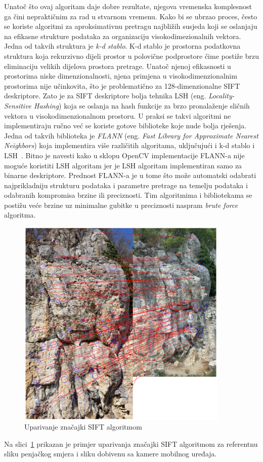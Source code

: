 Unatoč što ovaj algoritam daje dobre rezultate, njegova vremenska komplesnost ga čini nepraktičnim za rad u stvarnom vremenu. Kako bi se ubrzao proces, često se koriste algoritmi za aproksimativnu pretragu najbližih susjeda koji se oslanjaju na efikasne strukture podataka za organizaciju visokodimezionalnih vektora. 
Jedna od takvih struktura je \textit{k-d stablo}. K-d stablo je prostorna podatkovna struktura koja rekurzivno dijeli prostor u polovične podprostore čime postiže brzu eliminaciju velikih dijelova prostora pretrage. Unatoč njenoj efikasnosti u prostorima niske dimenzionalnosti, njena primjena u visokodimenzionalnim prostorima nije učinkovita, što je problematično za 128-dimenzionalne SIFT deskriptore. 
Zato je za SIFT deskriptore bolja tehnika LSH (eng. \textit{Locality-Sensitive Hashing}) koja se oslanja na hash funkcije za brzo pronalaženje sličnih vektora u visokodimenzionalnom prostoru.
U praksi se takvi algoritmi ne implementiraju ručno već se koriste gotove biblioteke koje nude bolja rješenja. Jedna od takvih biblioteka je \textit{FLANN} (eng. \textit{Fast Library for Approximate Nearest Neighbors}) koja implementira više različitih algoritama, uključujući i k-d stablo i LSH~\cite{flannmatcher}. Bitno je navesti kako u sklopu OpenCV implementacije FLANN-a nije moguće koristiti LSH algoritam jer je LSH algoritam implementiran samo za binarne deskriptore.
Prednost FLANN-a je u tome što može automatski odabrati najprikladniju strukturu podataka i parametre pretrage na temelju podataka i odabranih kompromisa brzine ili preciznosti. Tim algoritmima i bibliotekama se postižu veće brzine uz minimalne gubitke u preciznosti naspram \textit{brute force} algoritma.

\begin{figure}[H]
    \centering
    \includegraphics[width=0.9\textwidth]{images/racunalniVid/feature_matching.png}
    \caption{Uparivanje značajki SIFT algoritmom}
    \label{fig:uparivanje_znacajki}
\end{figure}

Na slici~\ref{fig:uparivanje_znacajki} prikazan je primjer uparivanja značajki SIFT algoritmom za referentnu sliku penjačkog smjera i sliku dobivenu sa kamere mobilnog uređaja.